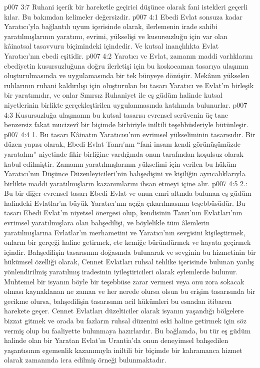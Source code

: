 \vs p007 3:7 Ruhani içerik bir hareketle geçirici düşünce olarak fani istekleri geçerli kılar. Bu bakımdan kelimeler değersizdir.
\vs p007 4:1 Ebedi Evlat sonsuza kadar Yaratıcı’yla bağlantılı uyum içerisinde olarak, ilerlemenin irade sahibi yaratılmışlarının yaratımı, evrimi, yükselişi ve kusursuzluğu için var olan kâinatsal tasavvuru biçimindeki  içindedir. Ve kutsal inançlılıkta Evlat Yaratıcı’nın ebedi eşitidir.
\vs p007 4:2 Yaratıcı ve Evlat, zamanın maddi varlıklarını ebediyetin kusursuzluğuna doğru ilerletişi için bu koskocaman tasarıya ulaşımın oluşturulmasında ve uygulamasında bir tek bünyeye dönüşür. Mekânın yükselen ruhlarının ruhani kaldırılışı için oluşturulan bu tasarı Yaratıcı ve Evlat’ın birleşik bir yaratımıdır, ve onlar Sınırsız Ruhaniyet ile eş güdüm halinde kutsal niyetlerinin birlikte gerçekleştirilen uygulanmasında katılımda bulunurlar.
\vs p007 4:3 Kusursuzluğa ulaşmanın bu kutsal tasarısı evrensel serüvenin üç tane benzersiz fakat mucizevî bir biçimde birbiriyle iniltili teşebbüsleriyle bütünleşir.
\vs p007 4:4 1.\bibnobreakspace {} Bu tasarı Kâinatın Yaratıcısı’nın evrimsel yükseliminin tasarısıdır. Bir düzen yapısı olarak, Ebedi Evlat Tanrı’nın “fani insanı kendi görünüşümüzde yaratalım” niyetinde fikir birliğine vardığında onun tarafından koşulsuz olarak kabul edilmiştir. Zamanın yaratılmışlarının yükselimi için verilen bu hüküm Yaratıcı’nın Düşünce Düzenleyicileri’nin bahşedişini ve kişiliğin ayrıcalıklarıyla birlikte maddi yaratılmışların kazanımlarını ihsan etmeyi içine alır.
\vs p007 4:5 2.\bibnobreakspace {}: Bu bir diğer evrensel tasarı Ebedi Evlat ve onun emri altında bulunan eş güdüm halindeki Evlatlar’ın büyük Yaratıcı’nın açığa çıkarılmasının teşebbüsüdür. Bu tasarı Ebedi Evlat’ın niyetsel önergesi olup, kendisinin Tanrı'nın Evlatları’nın evrimsel yaratılmışlara olan bahşedilişi, ve böylelikle tüm âlemlerin yaratılmışlarına Evlatlar’ın merhametini ve Yaratıcı’nın sevgisini kişileştirmek, onların bir gerçeği haline getirmek, ete kemiğe büründürmek ve hayata geçirmek içindir. Bahşedilişin tasarısının doğasında bulunarak ve sevginin bu hizmetinin bir hükümsel özelliği olarak, Cennet Evlatları ruhsal tehlike içerisinde bulunan yanlış yönlendirilmiş yaratılmış iradesinin iyileştiricileri olarak eylemlerde bulunur. Muhtemel bir isyanın böyle bir teşebbüse zarar vermesi veya onu zora sokacak olması kaynaklanan ne zaman ve her nerede olursa olsun bu erişim tasarısında bir gecikme olursa, bahşedilişin tasarısının acil hükümleri bu esnadan itibaren harekete geçer. Cennet Evlatları düzelticiler olarak isyanın yaşandığı bölgelere bizzat gitmek ve orada bu fazların ruhsal düzenini eski haline getirmek için söz vermiş olup bu faaliyette bulunmaya hazırlardır. Bu bağlamda, bu tür eş güdüm halinde olan bir Yaratan Evlat’ın Urantia’da onun deneyimsel bahşedilen yaşantısının egemenlik kazanımıyla iniltili bir biçimde bir kahramanca hizmet olarak zamanında icra edilmiş örneği bulunmaktadır.
